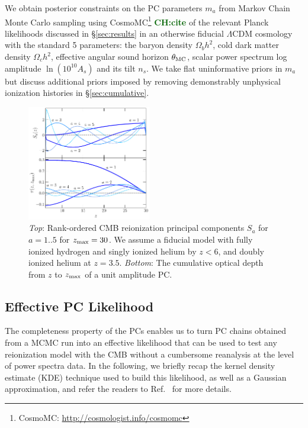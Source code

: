 \documentclass[aps,prd,twocolumn,amsmath,amssymb,showpacs,floatfix,superscriptaddress,nofootinbib]{revtex4-1}
\newcommand{\zmax}{z_{\rm max}}
\newcommand{\todo}[1]{\textcolor{darkgreen}{\bf{#1}}}
\begin{document}
We obtain posterior constraints on the PC parameters $m_a$ from Markov Chain Monte Carlo sampling using CosmoMC\footnote{CosmoMC: \url{http://cosmologist.info/cosmomc}} \todo{CH:cite} of the relevant Planck likelihoods discussed in \S \ref{sec:results} in an otherwise fiducial $\Lambda$CDM cosmology with the standard 5 parameters: the baryon density $\Omega_b h^2$, cold dark matter density 
$\Omega_c h^2$, effective angular sound horizon $\theta_{\rm MC}$, scalar power spectrum log amplitude $\ln (10^{10} A_s)$ and
its tilt $n_s$.  We take flat uninformative
priors in $m_a$ but discuss additional priors imposed by
removing demonstrably  unphysical ionization histories in \S \ref{sec:cumulative}.

 \begin{figure}
          \includegraphics[width=0.48\textwidth]{pl18_plot_pub_xe_basis_tau_basis_zmax30_heinrich.pdf}
          \caption{\textit{Top}: Rank-ordered CMB reionization principal components $S_a$ for $a = 1..5$ for $\zmax = 30$. We assume a fiducial model with fully ionized hydrogen and singly ionized helium by $z<6$, and doubly ionized helium at $z = 3.5$.
          \textit{Bottom}: The cumulative optical depth from $z$ to $z_{\rm max}$ of a unit amplitude PC. } 
          \label{fig:xe}
\end{figure}

%
%
%
%

\subsection{Effective PC Likelihood}
\label{sec:KDE}
The completeness property of the PCs enables us to turn PC chains obtained from a MCMC run into an effective likelihood that can be used to test any reionization model with the CMB without a cumbersome reanalysis at the level of power spectra data. In the following, we briefly recap the kernel density estimate (KDE) technique used to build this likelihood, as well as a Gaussian approximation, and refer the readers to Ref.~\cite{Heinrich:2016ojb} for more details.
\end{document}
